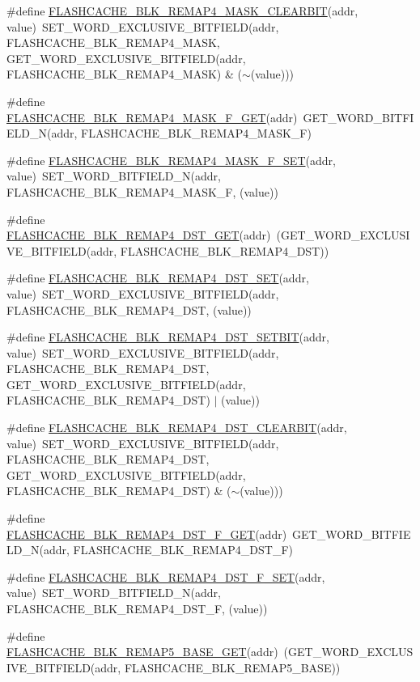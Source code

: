 \begin{DoxyCompactItemize}
\item 
\#define \hyperlink{a00549_a0b054a97b9909be609a70d2fbf907090}{FLASHCACHE\_\-BLK\_\-REMAP4\_\-MASK\_\-CLEARBIT}(addr, value)~SET\_\-WORD\_\-EXCLUSIVE\_\-BITFIELD(addr, FLASHCACHE\_\-BLK\_\-REMAP4\_\-MASK, GET\_\-WORD\_\-EXCLUSIVE\_\-BITFIELD(addr, FLASHCACHE\_\-BLK\_\-REMAP4\_\-MASK) \& ($\sim$(value)))
\item 
\#define \hyperlink{a00549_a3245ac02cb8e39788000b88228b2112e}{FLASHCACHE\_\-BLK\_\-REMAP4\_\-MASK\_\-F\_\-GET}(addr)~GET\_\-WORD\_\-BITFIELD\_\-N(addr, FLASHCACHE\_\-BLK\_\-REMAP4\_\-MASK\_\-F)
\item 
\#define \hyperlink{a00549_a7191b3c978f7dc4835b8b9400e54f572}{FLASHCACHE\_\-BLK\_\-REMAP4\_\-MASK\_\-F\_\-SET}(addr, value)~SET\_\-WORD\_\-BITFIELD\_\-N(addr, FLASHCACHE\_\-BLK\_\-REMAP4\_\-MASK\_\-F, (value))
\item 
\#define \hyperlink{a00549_add5acc098f10e38b99c0e325c94dc494}{FLASHCACHE\_\-BLK\_\-REMAP4\_\-DST\_\-GET}(addr)~(GET\_\-WORD\_\-EXCLUSIVE\_\-BITFIELD(addr, FLASHCACHE\_\-BLK\_\-REMAP4\_\-DST))
\item 
\#define \hyperlink{a00549_a7b290c858a559b8f751764b32b71b0df}{FLASHCACHE\_\-BLK\_\-REMAP4\_\-DST\_\-SET}(addr, value)~SET\_\-WORD\_\-EXCLUSIVE\_\-BITFIELD(addr, FLASHCACHE\_\-BLK\_\-REMAP4\_\-DST, (value))
\item 
\#define \hyperlink{a00549_abf2bf093c495b089413b54baa5c33f83}{FLASHCACHE\_\-BLK\_\-REMAP4\_\-DST\_\-SETBIT}(addr, value)~SET\_\-WORD\_\-EXCLUSIVE\_\-BITFIELD(addr, FLASHCACHE\_\-BLK\_\-REMAP4\_\-DST, GET\_\-WORD\_\-EXCLUSIVE\_\-BITFIELD(addr, FLASHCACHE\_\-BLK\_\-REMAP4\_\-DST) $|$ (value))
\item 
\#define \hyperlink{a00549_aae4ff056144f7e6e34c7979f748a5c7a}{FLASHCACHE\_\-BLK\_\-REMAP4\_\-DST\_\-CLEARBIT}(addr, value)~SET\_\-WORD\_\-EXCLUSIVE\_\-BITFIELD(addr, FLASHCACHE\_\-BLK\_\-REMAP4\_\-DST, GET\_\-WORD\_\-EXCLUSIVE\_\-BITFIELD(addr, FLASHCACHE\_\-BLK\_\-REMAP4\_\-DST) \& ($\sim$(value)))
\item 
\#define \hyperlink{a00549_a3458e7c903759942d2cd480b5181b5d3}{FLASHCACHE\_\-BLK\_\-REMAP4\_\-DST\_\-F\_\-GET}(addr)~GET\_\-WORD\_\-BITFIELD\_\-N(addr, FLASHCACHE\_\-BLK\_\-REMAP4\_\-DST\_\-F)
\item 
\#define \hyperlink{a00549_ae80feb6d3ce7f59581641d0ccc909810}{FLASHCACHE\_\-BLK\_\-REMAP4\_\-DST\_\-F\_\-SET}(addr, value)~SET\_\-WORD\_\-BITFIELD\_\-N(addr, FLASHCACHE\_\-BLK\_\-REMAP4\_\-DST\_\-F, (value))
\item 
\#define \hyperlink{a00549_a0f5bbec8941c7896a96de13258ddf8e8}{FLASHCACHE\_\-BLK\_\-REMAP5\_\-BASE\_\-GET}(addr)~(GET\_\-WORD\_\-EXCLUSIVE\_\-BITFIELD(addr, FLASHCACHE\_\-BLK\_\-REMAP5\_\-BASE))

\end{DoxyCompactItemize}
